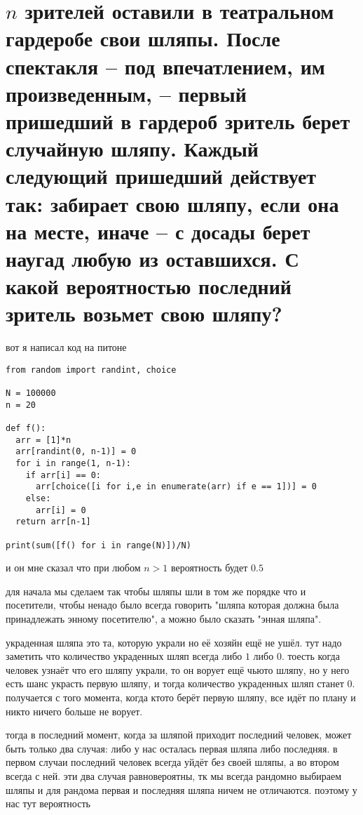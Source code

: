 \documentclass{article}
\begin{document}
  \section{$n$ зрителей оставили в театральном гардеробе свои шляпы. После спектакля -- под впечатлением, им произведенным, -- первый пришедший в гардероб зритель берет случайную шляпу. Каждый следующий пришедший действует так: забирает свою шляпу, если она на месте, иначе -- с досады берет наугад любую из оставшихся. С какой вероятностью последний зритель возьмет свою шляпу?}
  вот я написал код на питоне
  \begin{Verbatim}[frame=single]
from random import randint, choice

N = 100000
n = 20

def f():
  arr = [1]*n
  arr[randint(0, n-1)] = 0
  for i in range(1, n-1):
    if arr[i] == 0:
      arr[choice([i for i,e in enumerate(arr) if e == 1])] = 0
    else:
      arr[i] = 0
  return arr[n-1]

print(sum([f() for i in range(N)])/N)
  \end{Verbatim}
  и он мне сказал что при любом $n>1$ вероятность будет $0.5$

  для начала мы сделаем так чтобы шляпы шли в том же порядке что и посетители,
  чтобы ненадо было всегда говорить "{}шляпа которая должна была принадлежать энному посетителю"{},
  а можно было сказать "{}энная шляпа"{}.

  украденная шляпа это та, которую украли но её хозяйн ещё не ушёл.
  тут надо заметить что количество украденных шляп всегда либо $1$ либо $0$.
  тоесть когда человек узнаёт что его шляпу украли, то он ворует ещё чьюто шляпу, но у него есть шанс украсть первую шляпу,
  и тогда количество украденных шляп станет $0$.
  получается с того момента, когда ктото берёт первую шляпу, все идёт по плану и никто ничего больше не ворует.

  тогда в последний момент, когда за шляпой приходит последний человек, может быть только два случая:
  либо у нас осталась первая шляпа либо последняя.
  в первом случаи последний человек всегда уйдёт без своей шляпы, а во втором всегда с ней.
  эти два случая равновероятны, тк мы всегда рандомно выбираем шляпы и для рандома первая и последняя шляпа ничем не отличаются.
  поэтому у нас тут вероятность 

\end{document}
